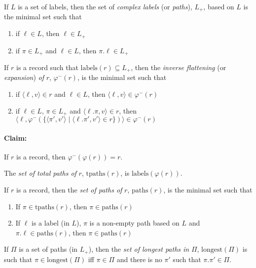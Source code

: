 If $L$ is a set of labels,
then the set of \textit{complex labels} (or \textit{paths}), $L_+$,
based on $L$ is the minimal set such that
\begin{enumerate} 
 
\item if $\ell\in L$, then $\ell\in L_+$ 
 
\item if $\pi\in L_+$ and $\ell\in L$, then $\pi.\ell\in L_+$ 
 
\end{enumerate}

If $r$ is a record such that $\mathrm{labels}(r)\subseteq L_+$, then
the \textit{inverse flattening} (or \textit{expansion}) \textit{of}
$r$, $\varphi^-(r)$, is the minimal set such that
\begin{enumerate} 
 
\item if $\langle\ell,v\rangle\in r$ and $\ell\in L$, then $\langle\ell,v\rangle\in\varphi^-(r)$ 
 
\item if $\ell\in L$, $\pi\in L_+$ and $\langle\ell.\pi,v\rangle\in
  r$, then 
$\langle\ell,\varphi^-(\{\langle\pi',v'\rangle\mid\langle\ell.\pi',v'\rangle\in r\})\rangle\in\varphi^-(r)$
 
\end{enumerate}

\paragraph{Claim:} If $r$ is a record, then $\varphi^-(\varphi(r))=r$.

The \textit{set of total paths of} $r$, $\mathrm{tpaths}(r)$, is
$\mathrm{labels}(\varphi(r))$.

If $r$ is a record, then the \textit{set
  of paths of} $r$, $\mathrm{paths}(r)$, is the minimal set such that
\begin{enumerate} 
 
\item If $\pi\in\mathrm{tpaths}(r)$, then $\pi\in\mathrm{paths}(r)$ 
 
\item If $\ell$ is a label (in $L$), $\pi$ is a non-empty path based
  on $L$ and
  $\pi.\ell\in\mathrm{paths}(r)$, then $\pi\in\mathrm{paths}(r)$ 
 
\end{enumerate} 

If $\Pi$ is a set of paths (in $L_+$), then the \textit{set of longest
  paths in} $\Pi$, $\mathrm{longest}(\Pi)$ is such that
$\pi\in\mathrm{longest}(\Pi)$ iff $\pi\in\Pi$ and there is no $\pi'$
such that $\pi.\pi'\in\Pi$.


